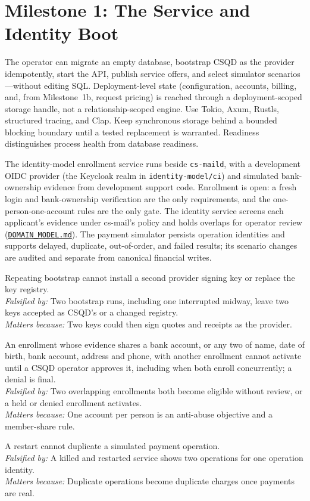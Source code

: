 \documentclass[11pt]{article}
\newenvironment{claims}{\begin{description}[leftmargin=1em,style=nextline,itemsep=0.4em]}{\end{description}}
\newcommand{\claim}[4]{\Needspace{6\baselineskip}\item[Claim (#1).] #2\\
    \textit{Falsified by:} #3\\
    \textit{Matters because:} #4}
\begin{document}
\section{Milestone 1: The Service and Identity Boot}

The operator can migrate an empty database, bootstrap CSQD as the provider
idempotently, start the API, publish service offers, and select simulator
scenarios---without editing SQL. Deployment-level state (configuration, accounts,
billing, and, from Milestone~1b, request pricing) is reached through a
deployment-scoped storage handle, not a relationship-scoped engine. Use Tokio, Axum, Rustls,
structured tracing, and Clap. Keep synchronous storage behind a bounded blocking
boundary until a tested replacement is warranted. Readiness distinguishes process
health from database readiness.

The identity-model enrollment service runs beside \texttt{cs-maild}, with a
development OIDC provider (the Keycloak realm in \texttt{identity-model/ci}) and
simulated bank-ownership evidence from development support code. Enrollment is
open: a fresh login and bank-ownership verification are the only requirements,
and the one-person-one-account rules are the only gate. The identity service screens
each applicant's evidence under cs-mail's policy and holds overlaps for operator
review (\href{DOMAIN_MODEL.md}{\texttt{DOMAIN\_MODEL.md}}). The payment
simulator persists operation identities and supports delayed, duplicate,
out-of-order, and failed results; its scenario changes are audited and separate
from canonical financial writes.

\begin{claims}
\claim{PostgreSQL}{Repeating bootstrap cannot install a second provider signing key or replace the key registry.}
    {Two bootstrap runs, including one interrupted midway, leave two keys accepted as CSQD's or a changed registry.}
    {Two keys could then sign quotes and receipts as the provider.}
\claim{PostgreSQL}{An enrollment whose evidence shares a bank account, or any two of name, date of birth, bank account, address and phone, with another enrollment cannot activate until a CSQD operator approves it, including when both enroll concurrently; a denial is final.}
    {Two overlapping enrollments both become eligible without review, or a held or denied enrollment activates.}
    {One account per person is an anti-abuse objective and a member-share rule.}
\claim{PostgreSQL}{A restart cannot duplicate a simulated payment operation.}
    {A killed and restarted service shows two operations for one operation identity.}
    {Duplicate operations become duplicate charges once payments are real.}
\end{claims}
\end{document}
